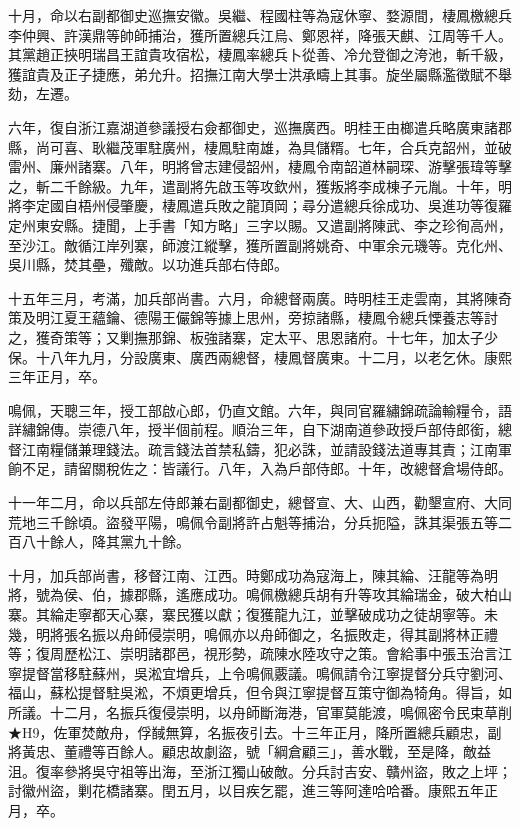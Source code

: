 \begin{pinyinscope}
十月，命以右副都御史巡撫安徽。吳繼、程國柱等為寇休寧、婺源間，棲鳳檄總兵李仲興、許漢鼎等帥師捕治，獲所置總兵江烏、鄭恩祥，降張天麒、江周等千人。其黨趙正挾明瑞昌王誼貴攻宿松，棲鳳率總兵卜從善、冷允登御之洿池，斬千級，獲誼貴及正子捷應，弟允升。招撫江南大學士洪承疇上其事。旋坐屬縣濫徵賦不舉劾，左遷。

六年，復自浙江嘉湖道參議授右僉都御史，巡撫廣西。明桂王由榔遣兵略廣東諸郡縣，尚可喜、耿繼茂軍駐廣州，棲鳳駐南雄，為具儲糈。七年，合兵克韶州，並破雷州、廉州諸寨。八年，明將曾志建侵韶州，棲鳳令南韶道林嗣琛、游擊張瑋等擊之，斬二千餘級。九年，遣副將先啟玉等攻欽州，獲叛將李成棟子元胤。十年，明將李定國自梧州侵肇慶，棲鳳遣兵敗之龍頂岡；尋分遣總兵徐成功、吳進功等復羅定州東安縣。捷聞，上手書「知方略」三字以賜。又遣副將陳武、李之珍徇高州，至沙江。敵循江岸列寨，師渡江縱擊，獲所置副將姚奇、中軍余元璣等。克化州、吳川縣，焚其壘，殲敵。以功進兵部右侍郎。

十五年三月，考滿，加兵部尚書。六月，命總督兩廣。時明桂王走雲南，其將陳奇策及明江夏王蘊鑰、德陽王儼錦等據上思州，旁掠諸縣，棲鳳令總兵慄養志等討之，獲奇策等；又剿撫那錦、板強諸寨，定太平、思恩諸府。十七年，加太子少保。十八年九月，分設廣東、廣西兩總督，棲鳳督廣東。十二月，以老乞休。康熙三年正月，卒。

鳴佩，天聰三年，授工部啟心郎，仍直文館。六年，與同官羅繡錦疏論輸糧令，語詳繡錦傳。崇德八年，授半個前程。順治三年，自下湖南道參政授戶部侍郎銜，總督江南糧儲兼理錢法。疏言錢法首禁私鑄，犯必誅，並請設錢法道專其責；江南軍餉不足，請留關稅佐之：皆議行。八年，入為戶部侍郎。十年，改總督倉場侍郎。

十一年二月，命以兵部左侍郎兼右副都御史，總督宣、大、山西，勸墾宣府、大同荒地三千餘頃。盜發平陽，鳴佩令副將許占魁等捕治，分兵扼隘，誅其渠張五等二百八十餘人，降其黨九十餘。

十月，加兵部尚書，移督江南、江西。時鄭成功為寇海上，陳其綸、汪龍等為明將，號為侯、伯，據郡縣，遙應成功。鳴佩檄總兵胡有升等攻其綸瑞金，破大柏山寨。其綸走寧都天心寨，寨民獲以獻；復獲龍九江，並擊破成功之徒胡寧等。未幾，明將張名振以舟師侵崇明，鳴佩亦以舟師御之，名振敗走，得其副將林正禮等；復周歷松江、崇明諸郡邑，視形勢，疏陳水陸攻守之策。會給事中張玉治言江寧提督當移駐蘇州，吳淞宜增兵，上令鳴佩覈議。鳴佩請令江寧提督分兵守劉河、福山，蘇松提督駐吳淞，不煩更增兵，但令與江寧提督互策守御為犄角。得旨，如所議。十二月，名振兵復侵崇明，以舟師斷海港，官軍莫能渡，鳴佩密令民束草削★H9，佐軍焚敵舟，俘馘無算，名振夜引去。十三年正月，降所置總兵顧忠，副將黃忠、董禮等百餘人。顧忠故劇盜，號「綱倉顧三」，善水戰，至是降，敵益沮。復率參將吳守祖等出海，至浙江獨山破敵。分兵討吉安、贛州盜，敗之上坪；討徽州盜，剿花橋諸寨。閏五月，以目疾乞罷，進三等阿達哈哈番。康熙五年正月，卒。


\end{pinyinscope}

